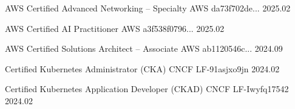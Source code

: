

\begin{cvhonors}
  \cvhonor
    {AWS Certified Advanced Networking – Specialty} %
    {AWS} %
    {da73f702de...} %
    {2025.02} %

  \cvhonor
    {AWS Certified AI Practitioner} %
    {AWS} %
    {a3f538f0796...} %
    {2025.02} %

  \cvhonor
    {AWS Certified Solutions Architect – Associate} %
    {AWS} %
    {ab1120546c...} %
    {2024.09} %

  \cvhonor
    {Certified Kubernetes Administrator (CKA)} %
    {CNCF} %
    {LF-91asjxo9jn} %
    {2024.02} %

  \cvhonor
    {Certified Kubernetes Application Developer (CKAD)} %
    {CNCF} %
    {LF-Iwyfq17542} %
    {2024.02} %

\end{cvhonors}
